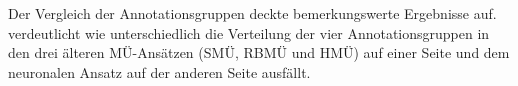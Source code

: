 Der Vergleich der Annotationsgruppen deckte bemerkungswerte Ergebnisse auf.  verdeutlicht wie unterschiedlich die Verteilung der vier Annotationsgruppen in den drei älteren MÜ-Ansätzen (SMÜ, RBMÜ und HMÜ) auf einer Seite und dem neuronalen Ansatz auf der anderen Seite ausfällt.


\begin{figure}







\end{figure}
